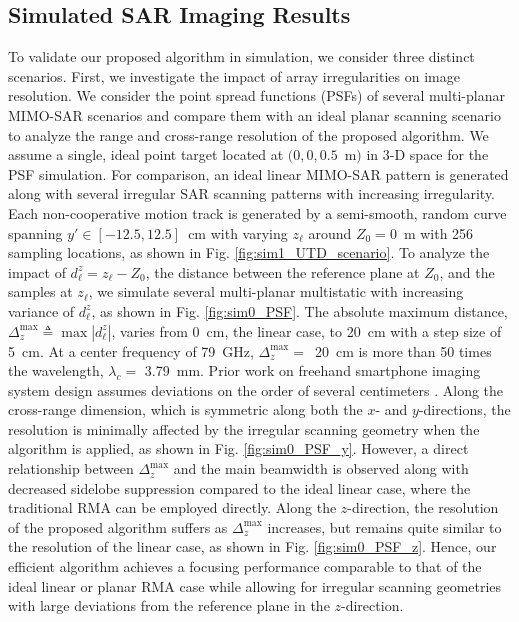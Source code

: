 \documentclass{ieeeaccess}
\begin{document}
\subsection{Simulated SAR Imaging Results}
\label{subsec:sim}
To validate our proposed algorithm in simulation, we consider three distinct scenarios.
First, we investigate the impact of array irregularities on image resolution.
We consider the point spread functions (PSFs) of several multi-planar MIMO-SAR scenarios and compare them with an ideal planar scanning scenario to analyze the range and cross-range resolution of the proposed algorithm. 
We assume a single, ideal point target located at \mbox{$(0, 0, 0.5$ m$)$} in \mbox{3-D} space for the PSF simulation. 
For comparison, an ideal linear MIMO-SAR pattern is generated along with several irregular SAR scanning patterns with increasing irregularity.
Each non-cooperative motion track is generated by a semi-smooth, random curve spanning \mbox{$y' \in [-12.5, 12.5]$ cm} with varying $z_\ell$ around \mbox{$Z_0 = 0$ m} with 256 sampling locations, as shown in Fig. \ref{fig:sim1_UTD_scenario}. 
To analyze the impact of $d_\ell^z = z_\ell - Z_0$, the distance between the reference plane at $Z_0$, and the samples at $z_\ell$, we simulate several multi-planar multistatic with increasing variance of $d_\ell^z$, as shown in Fig. \ref{fig:sim0_PSF}. 
The absolute maximum distance, $\Delta_z^\text{max} \triangleq \max |d_\ell^z|$, varies from \mbox{0 cm}, the linear case, to \mbox{20 cm} with a step size of \mbox{5 cm}. 
At a center frequency of \mbox{79 GHz}, \mbox{$\Delta_z^\text{max} =$ 20 cm} is more than 50 times the wavelength, $\lambda_c =$ \mbox{3.79 mm}. 
Prior work on freehand smartphone imaging system design assumes deviations on the order of several centimeters \cite{alvarez2021towards}. 
Along the cross-range dimension, which is symmetric along both the $x$- and $y$-directions, the resolution is minimally affected by the irregular scanning geometry when the algorithm is applied, as shown in Fig. \ref{fig:sim0_PSF_y}. 
However, a direct relationship between $\Delta_z^\text{max}$ and the main beamwidth is observed along with decreased sidelobe suppression compared to the ideal linear case, where the traditional RMA can be employed directly. 
Along the $z$-direction, the resolution of the proposed algorithm suffers as $\Delta_z^\text{max}$ increases, but remains quite similar to the resolution of the linear case, as shown in Fig. \ref{fig:sim0_PSF_z}. 
Hence, our efficient algorithm achieves a focusing performance comparable to that of the ideal linear or planar RMA case while allowing for irregular scanning geometries with large deviations from the reference plane in the $z$-direction. 
\end{document}
